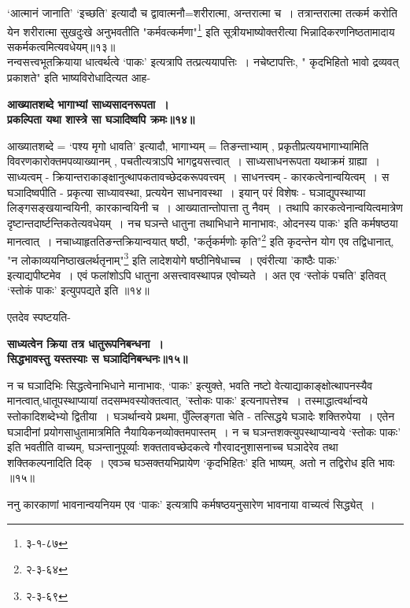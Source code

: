 {{`आत्मानं जानाति' `इच्छति' इत्यादौ च द्वावात्मनौ=शरीरात्मा, अन्तरात्मा च~।
तत्रान्तरात्मा तत्कर्म करोति येन शरीरात्मा सुखदुःखे अनुभवतीति "कर्मवत्कर्मणा"\footnote{३-१-८७} इति सूत्रीयभाष्योक्तरीत्या भिन्नादिकरणनिष्ठतामादाय सकर्मकत्वमित्यवधेयम्॥१३॥\\
 नन्वसत्त्वभूतक्रियाया धात्वर्थत्वे `पाकः' इत्यत्रापि तत्प्रत्ययापत्तिः~।
नचेष्टापत्तिः, " कृदभिहितो भावो द्रव्यवत् प्रकाशते" इति भाष्यविरोधादित्यत आह-
\begin{center}{\bfseries आख्यातशब्दे भागाभ्यां साध्यसादनरूपता~।\\
 प्रकल्पिता यथा शास्त्रे सा घञादिष्वपि क्रमः॥१४॥}
\end{center} 
 आख्यातशब्दे = `पश्य मृगो धावति' इत्यादौ, भागाभ्यम् = तिङन्ताभ्याम् , प्रकृतीप्रत्ययभागाभ्यामिति विवरणकारोक्तमपव्याख्यानम् , पचतीत्यत्राऽपि भागद्वयसत्त्वात्~।
साध्यसाधनरूपता यथाक्रमं ग्राह्या~।
साध्यत्वम् - क्रियान्तराकाङ्क्षानुत्थापकतावच्छेदकरूपवत्त्वम्~।
साधनत्त्वम् - कारकत्वेनान्वयित्वम्~।
स घञादिष्वपीति - प्रकृत्या साध्यावस्था, प्रत्ययेन साधनावस्था~।
इयान् परं विशेषः - घञाद्युपस्थाप्या लिङ्गसङ्खयान्वयिनी, कारकान्वयिनी च~।
आख्यातान्तोपात्ता तु नैवम्~।
तथापि कारकत्वेनान्वयित्वमात्रेण दृष्टान्तदार्ष्टन्तिकतेत्यवधेयम्~।
 नच घञन्ते धातुना तथाभिधाने मानाभावः, ओदनस्य पाकः' इति कर्मषष्ठया मानत्वात्~।
नचाध्याहृततिङन्तक्रियान्वयात् षष्ठी, "कर्तृकर्मणोः कृति"\footnote{२-३-६४} इति कृदन्तेन योग एव तद्विधानात्, "न लोकाव्ययनिष्ठाखलर्थतृनाम्"\footnote{२-३-६९} इति लादेशयोगे षष्ठीनिषेधाच्च~।
एवंरीत्या 'काष्ठैः पाकः' इत्याद्यपीष्टमेव~।
एवं फलांशोऽपि धातुना असत्त्वावस्थापन्न एवोच्यते~।
 अत एव `स्तोकं पचति' इतिवत् `स्तोकं पाकः' इत्युपपद्यते इति ॥१४॥\par
एतदेव स्पष्टयति-
\begin{center}{\bfseries साध्यत्वेन क्रिया तत्र धातुरूपनिबन्धना~।\\
 सिद्धभावस्तु यस्तस्याः स घञादिनिबन्धनः॥१५॥}
\end{center}
 न च घञादिभिः सिद्धत्वेनाभिधाने मानाभावः, `पाकः' इत्युक्ते, भवति नष्टो वेत्याद्याकाङ्क्षोत्थापनस्यैव मानत्वात्,धातूपस्थाप्यायां तदसम्भवस्योक्तत्वात्, 'स्तोकः पाकः' इत्यनापत्तेश्च~।
तस्माद्धात्वर्थान्वये स्तोकादिशब्देभ्यो द्वितीया~।
घञर्थान्वये प्रथमा, पुँल्लिङ्गता चेति - तत्सिद्धये घञादेः शक्तिरुपेया~।
एतेन घञादीनां प्रयोगसाधुतामात्रमिति नैयायिकनव्योक्तमपास्तम्~।
 न च घञन्तशक्त्युपस्थाप्यान्वये `स्तोकः पाकः' इति भवतीति वाच्यम्, घञन्तानुपूर्व्याः शक्ततावच्छेदकत्वे गौरवादनुशासनाच्च घञादेरेव तथा शक्तिकल्पनादिति दिक्~।
 एवञ्च घञ्सक्तयभिप्रायेण `कृदभिहितः' इति भाष्यम्, अतो न तद्विरोध इति भावः ॥१५॥\par
 ननु कारकाणां भावनान्वयनियम एव `पाकः' इत्यत्रापि कर्मषष्ठयनुसारेण भावनाया वाच्यत्वं सिद्ध्येत्~।
}}
